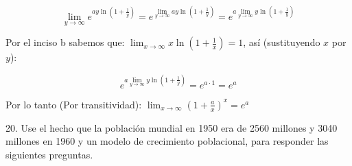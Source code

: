 \documentclass[12pt]{article}
\begin{document}
\begin{enumerate}[\hspace{9px} a)]
        \begin{equation*}
            \lim_{y \to \infty}e^{\displaystyle ay\ln\left(1+\frac{1}{y}\right)} = e^{\displaystyle\lim_{y \to \infty}ay\ln\left(1+\frac{1}{y}\right)} = e^{\displaystyle a\lim_{y \to \infty}y\ln\left(1+\frac{1}{y}\right)}
        \end{equation*}

        Por el inciso b sabemos que: \(\displaystyle\lim_{x \to \infty}x\ln\left(1+\frac{1}{x}\right)=1\), as\'i (sustituyendo $x$ por $y$):

        \begin{equation*}
            e^{a\displaystyle\lim_{y \to \infty}y\ln\left(1+\frac{1}{y}\right)} = e^{a\cdot1} = e^a
        \end{equation*}\medskip

        Por lo tanto (Por transitividad): \qquad
        \(\displaystyle\lim_{x \to \infty}\left(1+\frac{a}{x}\right)^x=e^a\)\bigskip

\end{enumerate}

20. Use el hecho que la poblaci\'on mundial en 1950 era de 2560 millones y 3040 millones en 1960 y un modelo de crecimiento poblacional, para responder las siguientes preguntas.
\end{document}
